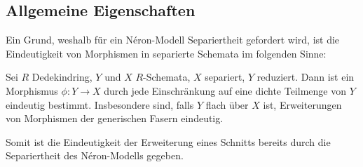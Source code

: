 \documentclass[german, bibliography=totoc]{scrreprt}
\begin{document}
\subsection{Allgemeine Eigenschaften}
Ein Grund, weshalb für ein Néron-Modell Separiertheit gefordert wird,
ist die Eindeutigkeit von Morphismen in separierte Schemata im
folgenden Sinne:
\begin{Satz}\label{thm:erweindeutig}
  Sei $R$ Dedekindring, $Y$ und $X$ $R$-Schemata, $X$ separiert, $Y$
  reduziert.
  Dann ist ein Morphismus $\phi\colon Y\to X$ durch jede
  Einschränkung auf eine dichte Teilmenge von $Y$ eindeutig bestimmt.
  Insbesondere sind, falls $Y$ flach über $X$ ist, Erweiterungen von
  Morphismen der generischen Fasern eindeutig.

\end{Satz}
Somit ist die Eindeutigkeit der Erweiterung eines Schnitts bereits
durch die Separiertheit des Néron-Modells gegeben.
\end{document}

